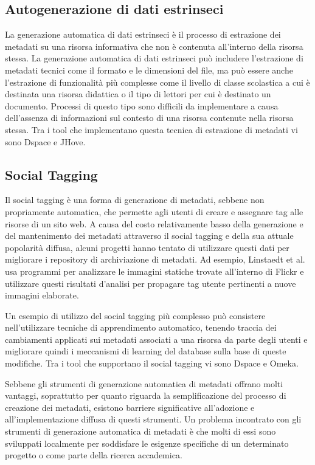 \subsection{Autogenerazione di dati estrinseci}
La generazione automatica di dati estrinseci è il processo di estrazione dei metadati su una risorsa informativa che non è contenuta all'interno della risorsa stessa. La generazione automatica di dati estrinseci può includere l'estrazione di metadati tecnici come il formato e le dimensioni del file, ma può essere anche l'estrazione di funzionalità più complesse come il livello di classe scolastica a cui è destinata una risorsa didattica o il tipo di lettori per cui è destinato un documento.
Processi di questo tipo sono difficili da implementare a causa dell'assenza di informazioni sul contesto di una risorsa
contenute nella risorsa stessa.
Tra i tool che implementano questa tecnica di estrazione di metadati vi sono Dspace e JHove.

\subsection{Social Tagging}
Il social tagging è una forma di generazione di metadati, sebbene non propriamente automatica, che permette agli utenti di creare e assegnare tag alle risorse di un sito web. A causa del costo relativamente basso della generazione e del mantenimento dei metadati attraverso il social tagging e della sua attuale popolarità diffusa, alcuni progetti hanno tentato di utilizzare questi dati per migliorare i repository di archiviazione di metadati. Ad esempio, Linstaedt et al. usa programmi per analizzare le immagini statiche trovate all'interno di Flickr e utilizzare questi risultati d'analisi per propagare tag utente pertinenti a nuove immagini elaborate.

Un esempio di utilizzo del social tagging più complesso può consistere nell'utilizzare tecniche di apprendimento automatico, tenendo traccia dei cambiamenti applicati sui metadati associati a una risorsa da parte degli utenti e migliorare quindi i meccanismi di learning del database sulla base di queste modifiche.
Tra i tool che supportano il social tagging vi sono Dspace e Omeka.

Sebbene gli strumenti di generazione automatica di metadati offrano molti vantaggi, soprattutto per quanto riguarda la semplificazione del processo di creazione dei metadati, esistono barriere significative all'adozione e all'implementazione diffusa di questi strumenti. Un problema incontrato con gli strumenti di generazione automatica di metadati è che molti di essi sono sviluppati localmente per soddisfare le esigenze specifiche di un determinato progetto o come parte della ricerca accademica.

